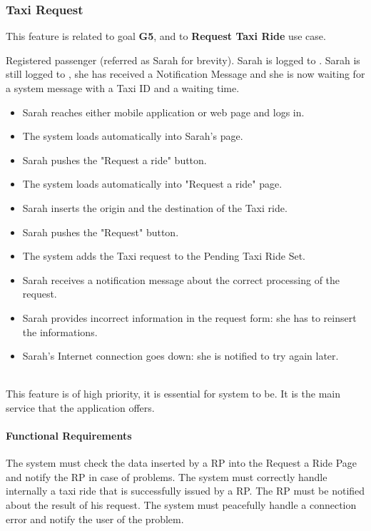\subsubsection{Taxi Request}
This feature is related to goal \textbf{G5}, and to \textbf{Request Taxi Ride} use case.
\begin{itemize}
	 Registered passenger (referred as Sarah for brevity).
	 Sarah is logged to \myTaxiService{}.
	 Sarah is still logged to \myTaxiService{}, she has received a Notification Message and she is now waiting for a system message with a Taxi ID and a waiting time.
	\begin{itemize}
		\item Sarah reaches either \myTaxiService{} mobile application or web page and logs in.
		\item The system loads automatically into Sarah's page.
		\item Sarah pushes the "Request a ride" button.
		\item The system loads automatically into "Request a ride" page.
		\item Sarah inserts the origin and the destination of the Taxi ride.
		\item Sarah pushes the "Request" button.
		\item The system adds the Taxi request to the Pending Taxi Ride Set.
		\item Sarah receives a notification message about the correct processing of the request. 
	\end{itemize}
	\begin{itemize}
		\item Sarah provides incorrect information in the request form: she has to reinsert the informations.
		\item Sarah's Internet connection goes down: she is notified to try again later.
	\end{itemize}
\end{itemize}
\\
This feature is of high priority, it is essential for \myTaxiService{} system to be. It is the main service that the application offers.
\paragraph{Functional Requirements}
\begin{itemize}
	 The system must check the data inserted by a RP into the Request a Ride Page and notify the RP in case of problems.
	 The system must correctly handle internally a taxi ride that is successfully issued by a RP.
	 The RP must be notified about the result of his request.
	 The system must peacefully handle a connection error and notify the user of the problem.
\end{itemize}
